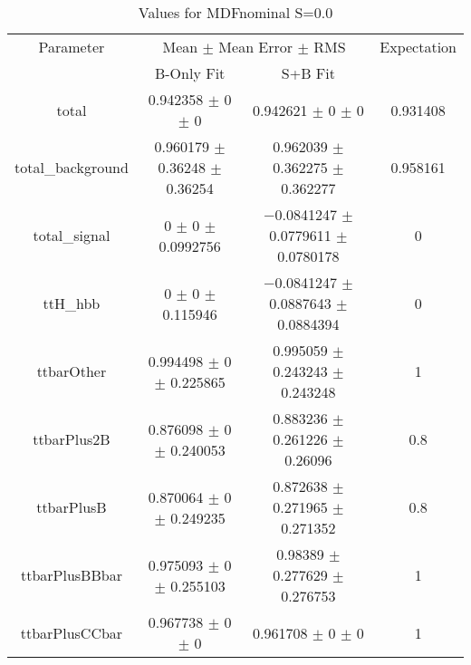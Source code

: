 \begin{table}
\centering
\caption{Values for MDFnominal S=0.0}
\begin{tabular}{cccc}
\toprule
Parameter & \multicolumn{2}{c}{Mean $\pm$ Mean Error $\pm$ RMS} & Expectation\\
 & B-Only Fit & S+B Fit & \\
\midrule
total & \num{0.942358} $\pm$ \num{0} $\pm$ \num{0} & \num{0.942621} $\pm$ \num{0} $\pm$ \num{0} & \num{0.931408}\\
total\_background & \num{0.960179} $\pm$ \num{0.36248} $\pm$ \num{0.36254} & \num{0.962039} $\pm$ \num{0.362275} $\pm$ \num{0.362277} & \num{0.958161}\\
total\_signal & \num{0} $\pm$ \num{0} $\pm$ \num{0.0992756} & \num{-0.0841247} $\pm$ \num{0.0779611} $\pm$ \num{0.0780178} & \num{0}\\
ttH\_hbb & \num{0} $\pm$ \num{0} $\pm$ \num{0.115946} & \num{-0.0841247} $\pm$ \num{0.0887643} $\pm$ \num{0.0884394} & \num{0}\\
ttbarOther & \num{0.994498} $\pm$ \num{0} $\pm$ \num{0.225865} & \num{0.995059} $\pm$ \num{0.243243} $\pm$ \num{0.243248} & \num{1}\\
ttbarPlus2B & \num{0.876098} $\pm$ \num{0} $\pm$ \num{0.240053} & \num{0.883236} $\pm$ \num{0.261226} $\pm$ \num{0.26096} & \num{0.8}\\
ttbarPlusB & \num{0.870064} $\pm$ \num{0} $\pm$ \num{0.249235} & \num{0.872638} $\pm$ \num{0.271965} $\pm$ \num{0.271352} & \num{0.8}\\
ttbarPlusBBbar & \num{0.975093} $\pm$ \num{0} $\pm$ \num{0.255103} & \num{0.98389} $\pm$ \num{0.277629} $\pm$ \num{0.276753} & \num{1}\\
ttbarPlusCCbar & \num{0.967738} $\pm$ \num{0} $\pm$ \num{0} & \num{0.961708} $\pm$ \num{0} $\pm$ \num{0} & \num{1}\\
\bottomrule
\end{tabular}
\end{table}